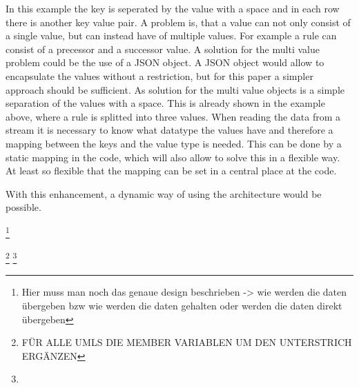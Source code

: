\documentclass[english]{cpp-hmwk}
\begin{document}
\noindent In this example the key is seperated by the value with a space and in each row there is another key value pair. A problem is, that a value can not only consist of a single value, but can instead have of multiple values. For example a rule can consist of a precessor and a successor value. 
A solution for the multi value problem could be the use of a JSON object. A JSON object would allow to encapsulate the values without a restriction, but for this paper a simpler approach should be sufficient. As solution for the multi value objects is a simple separation of the values with a space. This is already shown in the example above, where a rule is splitted into three values.
When reading the data from a stream it is necessary to know what datatype the values have and therefore a mapping between the keys and the value type is needed. This can be done by a static mapping in the code, which will also allow to solve this in a flexible way. At least so flexible that the mapping can be set in a central place at the code.

With this enhancement, a dynamic way of using the architecture would be possible.

\footnote{Hier muss man noch das genaue design beschrieben -> wie werden die daten übergeben bzw wie werden die daten gehalten oder werden die daten direkt übergeben }

\footnote{FÜR ALLE UMLS DIE MEMBER VARIABLEN UM DEN UNTERSTRICH ERGÄNZEN}
\footnote{}
\end{document}
